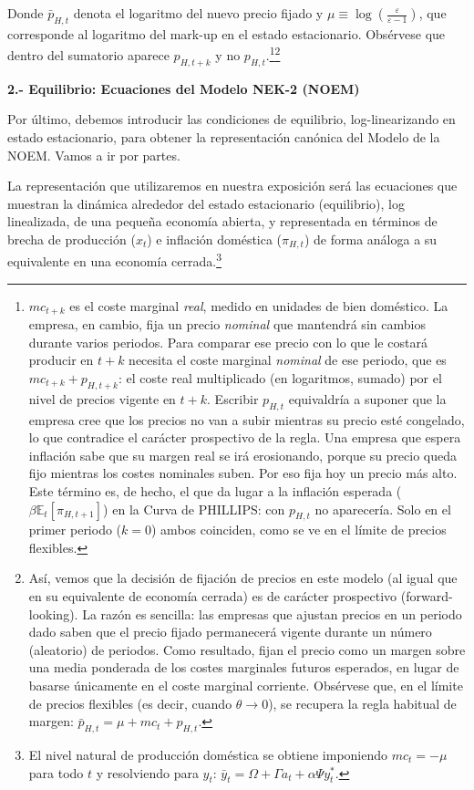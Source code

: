 \documentclass[10pt,a4paper]{article}
\begin{document}
Donde $\bar p_{H,t}$ denota el logaritmo del nuevo precio fijado y $\mu \equiv \log\left(\frac{\varepsilon}{\varepsilon-1}\right)$, que corresponde al logaritmo del mark-up en el estado estacionario. Obsérvese que dentro del sumatorio aparece $p_{H,t+k}$ y no $p_{H,t}$.\footnote{%
$mc_{t+k}$ es el coste marginal \textit{real}, medido en unidades de bien doméstico. La empresa, en cambio, fija un precio \textit{nominal} que mantendrá sin cambios durante varios periodos. Para comparar ese precio con lo que le costará producir en $t+k$ necesita el coste marginal \textit{nominal} de ese periodo, que es $mc_{t+k}+p_{H,t+k}$: el coste real multiplicado (en logaritmos, sumado) por el nivel de precios vigente en $t+k$. Escribir $p_{H,t}$ equivaldría a suponer que la empresa cree que los precios no van a subir mientras su precio esté congelado, lo que contradice el carácter prospectivo de la regla. Una empresa que espera inflación sabe que su margen real se irá erosionando, porque su precio queda fijo mientras los costes nominales suben. Por eso fija hoy un precio más alto. Este término es, de hecho, el que da lugar a la inflación esperada ($\beta\mathbb E_t[\pi_{H,t+1}]$) en la Curva de PHILLIPS: con $p_{H,t}$ no aparecería. Solo en el primer periodo ($k=0$) ambos coinciden, como se ve en el límite de precios flexibles.
%
}\footnote{%
Así, vemos que la decisión de fijación de precios en este modelo (al igual que en su equivalente de economía cerrada) es de carácter prospectivo (forward-looking). La razón es sencilla: las empresas que ajustan precios en un periodo dado saben que el precio fijado permanecerá vigente durante un número (aleatorio) de periodos. Como resultado, fijan el precio como un margen sobre una media ponderada de los costes marginales futuros esperados, en lugar de basarse únicamente en el coste marginal corriente. Obsérvese que, en el límite de precios flexibles (es decir, cuando $\theta \to 0$), se recupera la regla habitual de margen: $\bar p_{H,t} = \mu + mc_t + p_{H,t}$.
}

\textbf{2.- Equilibrio: Ecuaciones del Modelo NEK-2 (NOEM)}

Por último, debemos introducir las condiciones de equilibrio, log-linearizando en estado estacionario, para obtener la representación canónica del Modelo de la NOEM. Vamos a ir por partes. 

La representación que utilizaremos en nuestra exposición será las ecuaciones que muestran la dinámica alrededor del estado estacionario (equilibrio), log linealizada, de una pequeña economía abierta, y representada en términos de brecha de producción ($x_t$) e inflación doméstica ($\pi_{H,t}$) de forma análoga a su equivalente en una economía cerrada.\footnote{
  El nivel natural de producción doméstica se obtiene imponiendo $mc_t = -\mu$ para todo $t$ y resolviendo para $y_t$: $\bar y_t = \Omega + \Gamma a_t + \alpha\Psi y_t^*$.
}
\end{document}
